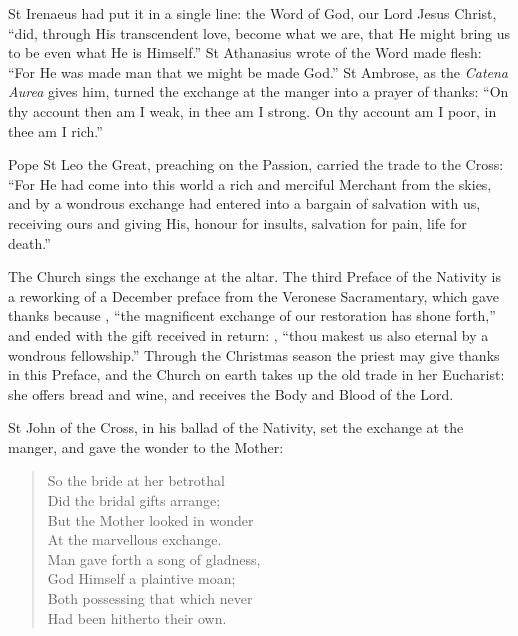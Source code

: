 \noindent St Irenaeus had put it in a single line: the
Word of God, our Lord Jesus Christ, ``did, through His transcendent love, become
what we are, that He might bring us to be even what He is Himself.'' St
Athanasius wrote of the Word made flesh: ``For He was made man that we might be
made God.'' St Ambrose, as the \emph{Catena Aurea} gives him, turned the exchange at
the manger into a prayer of thanks: ``On thy account then am I weak, in thee am I strong. On thy account
am I poor, in thee am I rich.''

Pope St Leo the Great, preaching on the Passion, carried the trade to the
Cross: ``For He had come into this world a rich and merciful Merchant from the
skies, and by a wondrous exchange had entered into a bargain of salvation with
us, receiving ours and giving His, honour for insults, salvation for pain, life
for death.''

The Church sings the exchange at the altar. The third Preface of the Nativity is
a reworking of a December preface from the Veronese Sacramentary, which gave
thanks because ,
``the magnificent exchange of our restoration has shone forth,'' and ended with the
gift received in return: ,
``thou makest us also eternal by a wondrous fellowship.'' Through the Christmas
season the priest may give thanks in this Preface, and the Church on earth takes
up the old trade in her Eucharist: she offers bread and wine, and receives the
Body and Blood of the Lord.

St John of the Cross, in his ballad of the Nativity, set the exchange at the
manger, and gave the wonder to the Mother:

\begin{verse}
So the bride at her betrothal\\
Did the bridal gifts arrange;\\
But the Mother looked in wonder\\
At the marvellous exchange.\\
Man gave forth a song of gladness,\\
God Himself a plaintive moan;\\
Both possessing that which never\\
Had been hitherto their own.
\end{verse}
